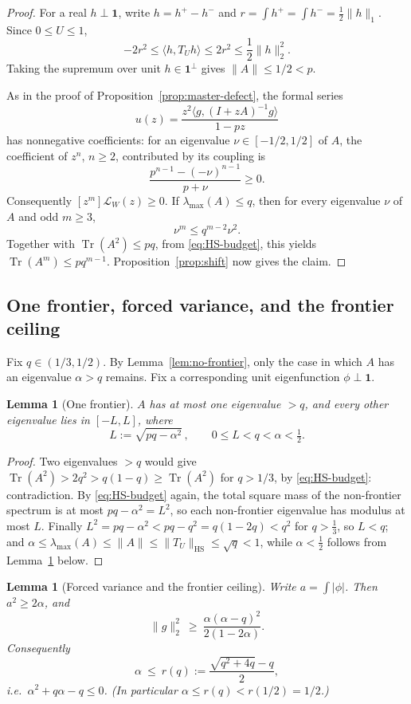 \documentclass[11pt]{article}
\newtheorem{lemma}[theorem]{Lemma}
\newcommand{\one}{\mathbf 1}
\newcommand{\Tr}{\operatorname{Tr}}
\begin{document}
\begin{proof}
For a real $h\perp\one$, write $h=h^+-h^-$ and
$r=\int h^+=\int h^-=\tfrac12\|h\|_1$.  Since $0\le U\le1$,
\[
 -2r^2\le\langle h,T_Uh\rangle\le2r^2
 \le\frac12\|h\|_2^2.
\]
Taking the supremum over unit $h\in\one^\perp$ gives $\|A\|\le1/2<p$.

As in the proof of Proposition~\ref{prop:master-defect}, the formal series
\[
 u(z)=\frac{z^2\langle g,(I+zA)^{-1}g\rangle}{1-pz}
\]
has nonnegative coefficients: for an eigenvalue $\nu\in[-1/2,1/2]$ of $A$,
the coefficient of $z^n$, $n\ge2$, contributed by its coupling is
\[
 \frac{p^{n-1}-(-\nu)^{n-1}}{p+\nu}\ge0.
\]
Consequently $[z^m]\mathcal L_W(z)\ge0$.  If
$\lambda_{\max}(A)\le q$, then for every eigenvalue $\nu$ of $A$ and odd
$m\ge3$,
\[
        \nu^m\le q^{m-2}\nu^2.
\]
Together with $\operatorname{Tr}(A^2)\le pq$, from
\eqref{eq:HS-budget}, this yields
$\operatorname{Tr}(A^m)\le pq^{m-1}$.  Proposition~\ref{prop:shift} now gives
the claim.
\end{proof}

\subsection{One frontier, forced variance, and the frontier ceiling}

Fix $q\in(1/3,1/2)$.  By Lemma~\ref{lem:no-frontier}, only the case in which
$A$ has an eigenvalue $\alpha>q$ remains.  Fix a corresponding unit
eigenfunction $\phi\perp\one$.

\begin{lemma}[One frontier]\label{lem:one-frontier}
$A$ has at most one eigenvalue $>q$, and every other eigenvalue lies in
$[-L,L]$, where
\[
        L:=\sqrt{pq-\alpha^2}\,,\qquad 0\le L<q<\alpha<\tfrac12 .
\]
\end{lemma}

\begin{proof}
Two eigenvalues $>q$ would give $\Tr(A^2)>2q^2>q(1-q)\ge\Tr(A^2)$ for
$q>1/3$, by \eqref{eq:HS-budget}: contradiction.  By \eqref{eq:HS-budget}
again, the total square mass of the non-frontier spectrum is at most
$pq-\alpha^2=L^2$, so each non-frontier eigenvalue has modulus at most $L$.
Finally $L^2=pq-\alpha^2<pq-q^2=q(1-2q)<q^2$ for $q>\tfrac13$, so $L<q$; and
$\alpha\le\lambda_{\max}(A)\le\|A\|\le\|T_U\|_{\mathrm{HS}}\le\sqrt q<1$,
while $\alpha<\tfrac12$ follows from Lemma~\ref{lem:forced-variance} below.
\end{proof}

\begin{lemma}[Forced variance and the frontier ceiling]\label{lem:forced-variance}
Write $a=\int|\phi|$.  Then $a^2\ge2\alpha$, and
\begin{equation}\label{eq:forced-variance}
        \|g\|_2^2\ \ge\ \frac{\alpha(\alpha-q)^2}{2(1-2\alpha)} .
\end{equation}
Consequently
\begin{equation}\label{eq:frontier-ceiling}
        \alpha\ \le\ r(q):=\frac{\sqrt{q^2+4q}-q}{2},
\end{equation}
i.e.\ $\alpha^2+q\alpha-q\le0$.  (In particular $\alpha\le r(q)<r(1/2)=1/2$.)
\end{lemma}
\end{document}
